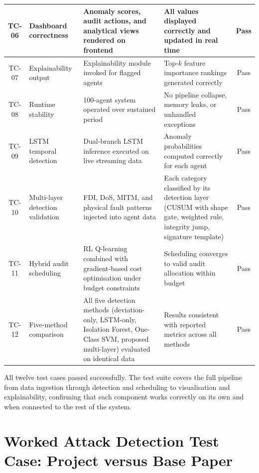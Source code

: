 \begin{longtable}{|c|p{3cm}|p{4.5cm}|p{3.5cm}|c|}
TC-06 & Dashboard correctness & Anomaly scores, audit actions, and analytical views rendered on frontend & All values displayed correctly and updated in real time & Pass \\ \hline

TC-07 & Explainability output & Explainability module invoked for flagged agents & Top-$k$ feature importance rankings generated correctly & Pass \\ \hline

TC-08 & Runtime stability & 100-agent system operated over sustained period & No pipeline collapse, memory leaks, or unhandled exceptions & Pass \\ \hline

TC-09 & LSTM temporal detection & Dual-branch LSTM inference executed on live streaming data & Anomaly probabilities computed correctly for each agent & Pass \\ \hline

TC-10 & Multi-layer detection validation & FDI, DoS, MITM, and physical fault patterns injected into agent data & Each category classified by its detection layer (CUSUM with shape gate, weighted rule, integrity jump, signature template) & Pass \\ \hline

TC-11 & Hybrid audit scheduling & RL Q-learning combined with gradient-based cost optimisation under budget constraints & Scheduling converges to valid audit allocation within budget & Pass \\ \hline

TC-12 & Five-method comparison & All five detection methods (deviation-only, LSTM-only, Isolation Forest, One-Class SVM, proposed multi-layer) evaluated on identical data & Results consistent with reported metrics across all methods & Pass \\ \hline

\end{longtable}

\par \vspace{0.35cm}

\noindent
All twelve test cases passed successfully. The test suite covers the full pipeline from data ingestion through detection and scheduling to visualisation and explainability, confirming that each component works correctly on its own and when connected to the rest of the system.


\section{Worked Attack Detection Test Case: Project versus Base Paper}
\label{sec:worked_attack}

